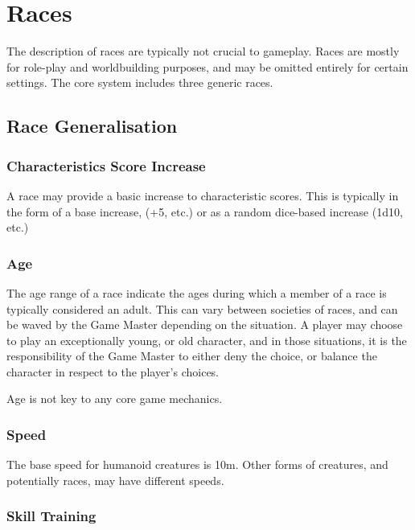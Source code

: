 \documentclass[]{article}
\begin{document}
\section{Races}\label{races}

The description of races are typically not crucial to gameplay. Races
are mostly for role-play and worldbuilding purposes, and may be omitted
entirely for certain settings. The core system includes three generic
races.

\subsection{Race Generalisation}\label{race-generalisation}

\subsubsection{Characteristics Score
Increase}\label{characteristics-score-increase}

A race may provide a basic increase to characteristic scores. This is
typically in the form of a base increase, (+5, etc.) or as a random
dice-based increase (1d10, etc.)

\subsubsection{Age}\label{age}

The age range of a race indicate the ages during which a member of a
race is typically considered an adult. This can vary between societies
of races, and can be waved by the Game Master depending on the
situation. A player may choose to play an exceptionally young, or old
character, and in those situations, it is the responsibility of the Game
Master to either deny the choice, or balance the character in respect to
the player's choices.

Age is not key to any core game mechanics.

\subsubsection{Speed}\label{speed}

The base speed for humanoid creatures is 10m. Other forms of creatures,
and potentially races, may have different speeds.

\subsubsection{Skill Training}\label{skill-training}
\end{document}
